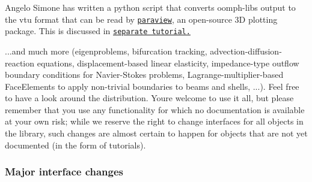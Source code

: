 \begin{DoxyItemize}
\item Angelo Simone has written a python script that converts {\ttfamily oomph-\/lib\textquotesingle{}s} output to the vtu format that can be read by \href{http://www.paraview.org}{\tt paraview}, an open-\/source 3D plotting package. This is discussed in \href{../../paraview/html/index.html}{\tt separate tutorial.} ~\newline
~\newline

\item ...and much more (eigenproblems, bifurcation tracking, advection-\/diffusion-\/reaction equations, displacement-\/based linear elasticity, impedance-\/type outflow boundary conditions for Navier-\/\+Stokes problems, Lagrange-\/multiplier-\/based {\ttfamily Face\+Elements} to apply non-\/trivial boundaries to beams and shells, ...). Feel free to have a look around the distribution. You\textquotesingle{}re welcome to use it all, but please remember that you use any functionality for which no documentation is available at your own risk; while we reserve the right to change interfaces for all objects in the library, such changes are almost certain to happen for objects that are not yet documented (in the form of tutorials). ~\newline
~\newline

\end{DoxyItemize}



\hypertarget{index_major_interface_changes_zero_point_five}{}\subsubsection{Major interface changes}\label{index_major_interface_changes_zero_point_five}

